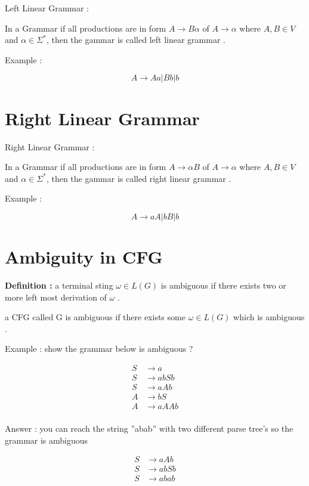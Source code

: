 \documentclass[12pt]{book}
\begin{document}
Left Linear Grammar :

In a Grammar if all productions are in form $A \to B\alpha$ of $A \to \alpha$ where $A, B \in V$ and $\alpha \in \Sigma^{*}$, then the gammar is called left linear grammar .

Example :

$$
A \to Aa | Bb | b
$$

\section{Right Linear Grammar}

Right Linear Grammar :

In a Grammar if all productions are in form $A \to \alpha B$ of $A \to \alpha$ where $A, B \in V$ and $\alpha \in \Sigma^{*}$, then the gammar is called right linear grammar .

Example :

$$
A \to aA | bB | b
$$

\section{Ambiguity in CFG}

\textbf{Definition :} a terminal sting $\omega \in L(G)$ is ambiguous if there exists two or more left most derivation of $\omega$ .

a CFG called G is ambiguous if there exists some $\omega \in L(G)$ which is ambiguous .

Example : 
show the grammar below is ambiguous ?

\begin{align*}
S &\to a \\
S &\to abSb \\
S &\to aAb \\
A &\to bS \\
A &\to aAAb \\
\end{align*}

Answer : you can reach the string ''abab'' with two different parse tree's so the grammar is ambiguous 

\begin{align*}
S &\to aAb \\
S &\to abSb \\
S &\to abab \\
\end{align*}

\end{document}
